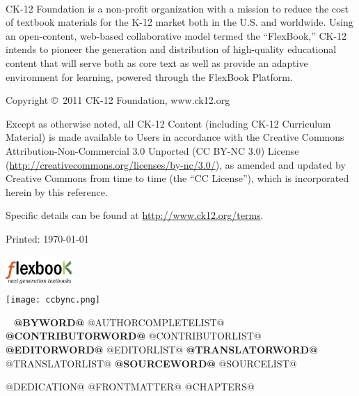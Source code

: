 \documentclass[xetex,11pt,twoside,openany]{book}
\begin{document}
{
  \setlength{\parindent}{0pt}
  \setlength{\parskip}{\baselineskip}
\begin{sloppypar}
  \\
  CK-12 Foundation is a non-profit organization with a mission to reduce the cost
  of textbook materials for the K-12 market both in the U.S. and worldwide.
  Using an open-content, web-based collaborative model termed the “FlexBook,”
  CK-12 intends to pioneer the generation and distribution of high-quality
  educational content that will serve both as core text as well as provide an
  adaptive environment for learning, powered through the FlexBook Platform\texttrademark.

  Copyright \copyright\  2011 CK-12 Foundation, www.ck12.org

  Except as otherwise noted, all CK-12 Content (including CK-12 Curriculum
  Material) is made available to Users in accordance with the Creative
  Commons Attribution-Non-Commercial 3.0 Unported (CC BY-NC 3.0)
  License (\url{http://creativecommons.org/licenses/by-nc/3.0/}), as
  amended and updated by Creative Commons from time to time (the ``CC License''),
  which is incorporated herein by this reference.

  Specific details can be found at \url{http://www.ck12.org/terms}.
  \end{sloppypar}

  Printed: \today

  \includegraphics[width=1in]{flexbooks.jpg}\\
  \texttt{[image: ccbync.png]}
}
\frontmatter{}

\thispagestyle{plain}
\twoside
{
\begin{center}
~\vfill
  \Large{}
  \textbf{@BYWORD@}
  \normalsize{}
  @AUTHORCOMPLETELIST@
  \Large{} 
  \textbf{@CONTRIBUTORWORD@}
  \normalsize{} 
  @CONTRIBUTORLIST@
  \Large{} 
  \textbf{@EDITORWORD@}
  \normalsize{} 
  @EDITORLIST@
  \Large{} 
  \textbf{@TRANSLATORWORD@}
  \normalsize{} 
  @TRANSLATORLIST@
  \Large{} 
  \textbf{@SOURCEWORD@}
  \normalsize{} 
  @SOURCELIST@
\vfill
\end{center}
}
\twoside
\newpage
@DEDICATION@
\pagestyle{plain}
\setcounter{tocdepth}{1}
\tableofcontents
@FRONTMATTER@
\mainmatter{}
\setcounter{page}{1}
\setcounter{chapter}{0}
@CHAPTERS@
\end{document}
